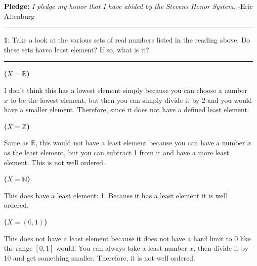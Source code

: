 \documentclass[11pt]{article}
\newcommand\question[2]{\vspace{.25in}\hrule\textbf{#1}: #2\vspace{.5em}\hrule\vspace{.10in}}
\renewcommand\part[1]{\vspace{.10in}\textbf{(#1)}\par}
\newcommand{\R}{\mathbb{R}}
\newcommand{\N}{\mathbb{N}}
\newcommand{\Z}{\mathbb{Z}}
\begin{document}
\raggedright
\newcommand\NAME{Eric Altenburg}  %
\newcommand\COURSE{MA-240}
\newcommand\HWNUM{5}              %


\textbf{Pledge:} \textit{I pledge my honor that I have abided by the Stevens Honor System.} -Eric Altenburg

\question{1}{Take a look at the various sets of real numbers listed in the reading above. Do these sets havea  least element? If so, what is it?}

\part{$X = \R$}
	I don't think this has a lowest element simply because you can choose a number $x$ to be the lowest element, but then you can simply divide it by 2 and you would have a smaller element. Therefore, since it does not have a defined least element.

\part{$X = \Z$}
	Same as $\R$, this would not have a least element because you can have a number $x$ as the least element, but you can subtract 1 from it and have a more least element. This is not well ordered.

\part{$X = \N$}
	This does have a least element: 1. Because it has a least element it is well ordered.

\part{$X = (0, 1)$}
	This does not have a least element because it does not have a hard limit to 0 like the range $[0, 1]$ would. You can always take a least number $x$, then divide it by 10 and get something smaller. Therefore, it is not well ordered.
\end{document}
